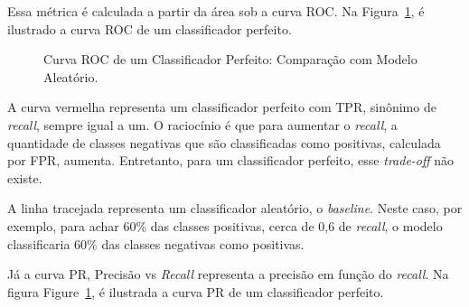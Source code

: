 Essa métrica é calculada a partir da área sob a curva ROC. Na Figura~\ref{fig:roc_perfect}, é ilustrado a curva ROC de um classificador perfeito.

\begin{figure}[H]
    \centering
    \caption{Curva ROC de um Classificador Perfeito: Comparação com Modelo Aleatório.}
    \label{fig:roc_perfect}
\end{figure}

A curva vermelha representa um classificador perfeito com TPR, sinônimo de \textit{recall}, sempre igual a um. O raciocínio é que 
para aumentar o \textit{recall}, a quantidade de classes negativas que são classificadas como positivas, calculada por FPR, aumenta. 
Entretanto, para um classificador perfeito, esse \textit{trade-off} não existe.

A linha tracejada representa um classificador aleatório, o \textit{baseline}. Neste caso, por exemplo, para achar 60\% das classes positivas,
cerca de 0,6 de \textit{recall}, o modelo classificaria 60\%  das classes negativas como positivas.

Já a curva PR, Precisão vs \textit{Recall} representa a precisão em função do \textit{recall}. Na figura Figure~\ref{fig:roc_perfect},
é ilustrada a curva PR de um classificador perfeito.

